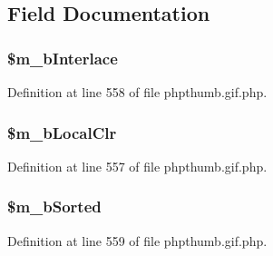 \subsection{\-Field \-Documentation}
\hypertarget{class_c_g_i_f_i_m_a_g_e_h_e_a_d_e_r_aacd9dcaea834f5b324b4406258a1d820}{
\subsubsection[{\$m\-\_\-b\-Interlace}]{\setlength{\rightskip}{0pt plus 5cm}\$m\-\_\-b\-Interlace}}\label{class_c_g_i_f_i_m_a_g_e_h_e_a_d_e_r_aacd9dcaea834f5b324b4406258a1d820}


\-Definition at line 558 of file phpthumb.\-gif.\-php.

\hypertarget{class_c_g_i_f_i_m_a_g_e_h_e_a_d_e_r_a6ebd1af43e6634575deba6c291129710}{
\subsubsection[{\$m\-\_\-b\-Local\-Clr}]{\setlength{\rightskip}{0pt plus 5cm}\$m\-\_\-b\-Local\-Clr}}\label{class_c_g_i_f_i_m_a_g_e_h_e_a_d_e_r_a6ebd1af43e6634575deba6c291129710}


\-Definition at line 557 of file phpthumb.\-gif.\-php.

\hypertarget{class_c_g_i_f_i_m_a_g_e_h_e_a_d_e_r_a3f19f097a290d16035e4c27eb90bb13c}{
\subsubsection[{\$m\-\_\-b\-Sorted}]{\setlength{\rightskip}{0pt plus 5cm}\$m\-\_\-b\-Sorted}}\label{class_c_g_i_f_i_m_a_g_e_h_e_a_d_e_r_a3f19f097a290d16035e4c27eb90bb13c}


\-Definition at line 559 of file phpthumb.\-gif.\-php.

